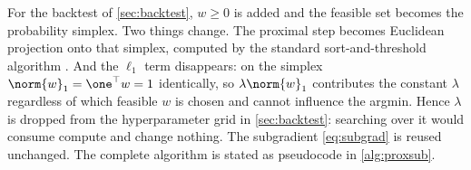 For the backtest of \cref{sec:backtest}, $w \ge 0$ is added and the feasible set becomes the
probability simplex. Two things change. The proximal step becomes Euclidean projection onto
that simplex, computed by the standard sort-and-threshold algorithm \citep{duchi2008}. And the
$\ell_1$ term disappears: on the simplex $\norm{w}_1 = \one^\top w = 1$ identically, so
$\lambda\norm{w}_1$ contributes the constant $\lambda$ regardless of which feasible $w$ is
chosen and cannot influence the argmin. Hence $\lambda$ is dropped from the hyperparameter grid
in \cref{sec:backtest}: searching over it would consume compute and change nothing. The
subgradient \cref{eq:subgrad} is reused unchanged. The complete algorithm is stated as
pseudocode in \cref{alg:proxsub}.
